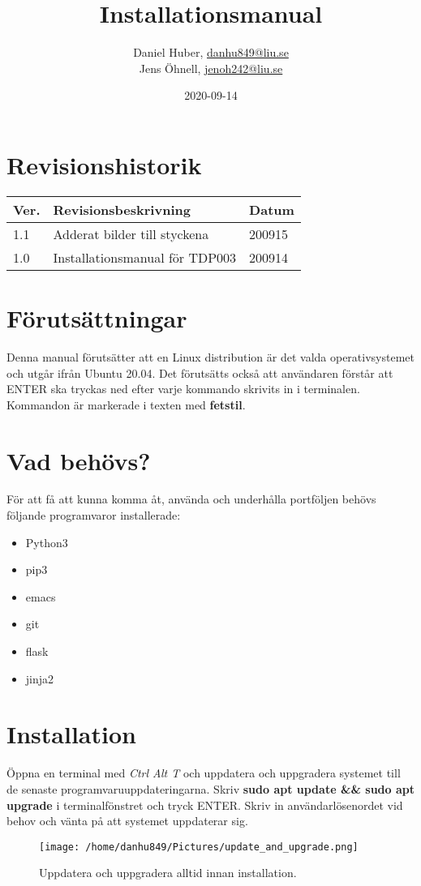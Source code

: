 \documentclass{TDP003mall}
\author{Daniel Huber, \url{danhu849@liu.se}\\
  Jens Öhnell, \url{jenoh242@liu.se}}
\title{Installationsmanual}
\date{2020-09-14}
\begin{document}
\projectpage
\section{Revisionshistorik}
\begin{table}[!h]
\begin{tabularx}{\linewidth}{|l|X|l|}
\hline
Ver. & Revisionsbeskrivning & Datum \\\hline
1.1 & Adderat bilder till styckena & 200915 \\\hline
1.0 & Installationsmanual för TDP003 & 200914 \\\hline
\end{tabularx}
\end{table}

\section{Förutsättningar}
Denna manual förutsätter att en Linux distribution är det valda operativsystemet och utgår ifrån Ubuntu 20.04. Det förutsätts också att användaren förstår att ENTER ska tryckas ned efter varje kommando skrivits in i terminalen. Kommandon är markerade i texten med \textbf{fetstil}.

\section{Vad behövs?}
För att få att kunna komma åt, använda och underhålla portföljen behövs följande programvaror installerade:
\begin{itemize}
  \item Python3
  \item pip3
  \item emacs
  \item git
  \item flask
  \item jinja2   
\end{itemize}

\section{Installation}
Öppna en terminal med \emph{Ctrl Alt T} och uppdatera och uppgradera systemet till de senaste programvaruuppdateringarna. Skriv \textbf{sudo apt update \&\& sudo apt upgrade} i terminalfönstret och tryck ENTER. Skriv in användarlösenordet vid behov och vänta på att systemet uppdaterar sig.

\begin{figure}[h]
  \centerline{\texttt{[image: /home/danhu849/Pictures/update\_and\_upgrade.png]}}
  \caption{Uppdatera och uppgradera alltid innan installation.}
  \label{fig}
\end{figure}
\end{document}
